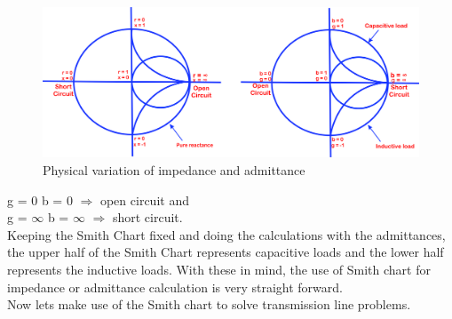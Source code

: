 \begin{figure}[h]
\centering
\includegraphics[width=1.0\linewidth]{./graphics/jnbkvfld}
\caption{Physical variation of impedance and admittance}
\label{fig:jnbkvfld}
\end{figure}
g = 0 b = 0 $\Longrightarrow$ open circuit and\\
g = $\infty$  b = $\infty$ $\Longrightarrow$  short circuit.\\
Keeping the Smith Chart fixed and doing the calculations with the admittances, the upper half of the Smith Chart represents capacitive loads and the lower half represents the inductive loads. With these in mind, the use of Smith chart for impedance or admittance calculation is very straight forward.\\
Now lets make use of the Smith chart to solve transmission line problems. 

